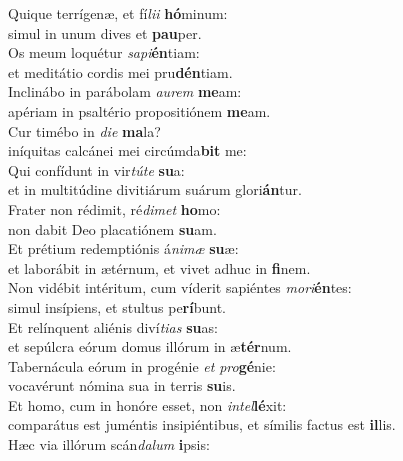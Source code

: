 \evenverse Quique terrígenæ, et fí\textit{li}\textit{i} \textbf{hó}minum:~\*\\
\evenverse simul in unum dives et \textbf{pau}per.\\
\oddverse Os meum loquétur \textit{sa}\textit{pi}\textbf{én}tiam:~\*\\
\oddverse et meditátio cordis mei pru\textbf{dén}tiam.\\
\evenverse Inclinábo in parábolam \textit{au}\textit{rem} \textbf{me}am:~\*\\
\evenverse apériam in psaltério propositiónem \textbf{me}am.\\
\oddverse Cur timébo in \textit{di}\textit{e} \textbf{ma}la?~\*\\
\oddverse iníquitas calcánei mei circúmda\textbf{bit} me:\\
\evenverse Qui confídunt in vir\textit{tú}\textit{te} \textbf{su}a:~\*\\
\evenverse et in multitúdine divitiárum suárum glori\textbf{án}tur.\\
\oddverse Frater non rédimit, ré\textit{di}\textit{met} \textbf{ho}mo:~\*\\
\oddverse non dabit Deo placatiónem \textbf{su}am.\\
\evenverse Et prétium redemptiónis á\textit{ni}\textit{mæ} \textbf{su}æ:~\*\\
\evenverse et laborábit in ætérnum, et vivet adhuc in \textbf{fi}nem.\\
\oddverse Non vidébit intéritum, cum víderit sapiéntes \textit{mo}\textit{ri}\textbf{én}tes:~\*\\
\oddverse simul insípiens, et stultus pe\textbf{rí}bunt.\\
\evenverse Et relínquent aliénis diví\textit{ti}\textit{as} \textbf{su}as:~\*\\
\evenverse et sepúlcra eórum domus illórum in æ\textbf{tér}num.\\
\oddverse Tabernácula eórum in progénie \textit{et} \textit{pro}\textbf{gé}nie:~\*\\
\oddverse vocavérunt nómina sua in terris \textbf{su}is.\\
\evenverse Et homo, cum in honóre esset, non \textit{in}\textit{tel}\textbf{lé}xit:~\*\\
\evenverse comparátus est juméntis insipiéntibus, et símilis factus est \textbf{il}lis.\\
\oddverse Hæc via illórum scán\textit{da}\textit{lum} \textbf{i}psis:~\*\\
